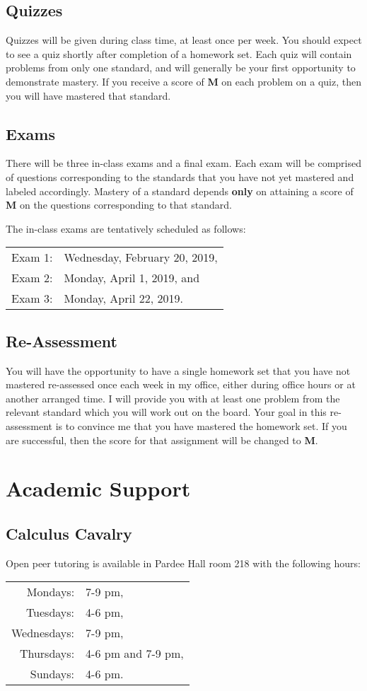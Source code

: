 \documentclass[12pt]{amsart}
\begin{document}
\subsection*{Quizzes}
Quizzes will be given during class time, at least once per week.
You should expect to see a quiz shortly after completion of a homework set.
Each quiz will contain problems from only one standard, and will generally be your first opportunity to demonstrate mastery.
If you receive a score of \textbf{M} on each problem on a quiz, then you will have mastered that standard.

\subsection*{Exams}
There will be three in-class exams and a final exam.
Each exam will be comprised of questions corresponding to the standards that you have not yet mastered and labeled accordingly.
Mastery of a standard depends \textbf{only} on attaining a score of \textbf{M} on the questions corresponding to that standard.

The in-class exams are tentatively scheduled as follows:
\begin{center}
  \begin{tabular}{rl}
    Exam 1: & Wednesday, February 20, 2019,\\
    Exam 2: & Monday, April 1, 2019, and\\
    Exam 3: & Monday, April 22, 2019.
  \end{tabular}
\end{center}

\subsection*{Re-Assessment}
You will have the opportunity to have a single homework set that you have not mastered re-assessed once each week in my office, either during office hours or at another arranged time.
I will provide you with at least one problem from the relevant standard which you will work out on the board.
Your goal in this re-assessment is to convince me that you have mastered the homework set.
If you are successful, then the score for that assignment will be changed to \textbf{M}.

\section*{Academic Support}
\subsection*{Calculus Cavalry}
\noindent
Open peer tutoring is available in Pardee Hall room 218 with the following hours:
\begin{center}
  \begin{tabular}{rl}
    Mondays: & 7-9 pm,\\
    Tuesdays: & 4-6 pm,\\
    Wednesdays: & 7-9 pm,\\
    Thursdays: & 4-6 pm and 7-9 pm,\\
    Sundays: &4-6 pm.
  \end{tabular}
\end{center}
\end{document}
